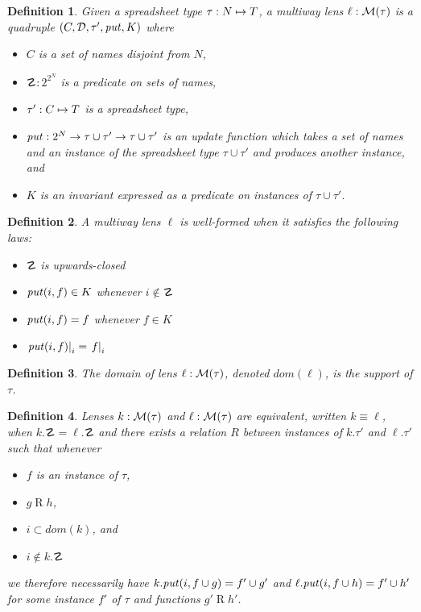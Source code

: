 \documentclass{article}
\newtheorem{definition}{Definition}
\begin{document}
\begin{definition}
    Given a spreadsheet type $\tau : N \mapsto T$,
    a \emph{multiway lens} $\ell : \mathcal M(\tau)$ is a quadruple
    $(C,\mathcal D,\tau',\mathit{put},K)$ where
    \begin{itemize}
        \item $C$ is a set of names disjoint from $N$,
        \item $\danger : 2^{2^N}$ is a predicate on sets of names,
        \item $\tau' : C \mapsto T$ is a spreadsheet type,
        \item $\mathit{put} : 2^N \to \tau \cup \tau' \to \tau \cup \tau'$
            is an update function which takes a set of names and an instance
            of the spreadsheet type $\tau \cup \tau'$ and produces another
            instance, and
        \item $K$ is an invariant expressed as a predicate on instances of
            $\tau \cup \tau'$.
    \end{itemize}
\end{definition}

\begin{definition}
    A multiway lens $\ell$ is \emph{well-formed} when it satisfies the
    following laws:
    \begin{itemize}
        \item $\danger$ is upwards-closed
        \item $\mathit{put}(i,f) \in K$ whenever $i \notin \danger$
        \item $\mathit{put}(i,f) = f$ whenever $f \in K$
        \item $\left.\mathit{put}(i,f)\right|_i = \left.f\right|_i$
    \end{itemize}
\end{definition}

\newcommand{\mdomain}[1]{\mathit{dom}(#1)}
\begin{definition}
    The \emph{domain} of lens $\ell : \mathcal M(\tau)$, denoted $\mdomain\ell$, is
    the support of $\tau$.
\end{definition}

\begin{definition}
    Lenses $k : \mathcal M(\tau)$ and $\ell : \mathcal M(\tau)$ are \emph{equivalent},
    written $k \equiv \ell$, when $k.\danger = \ell.\danger$ and there
    exists a relation $R$ between instances of $k.\tau'$ and $\ell.\tau'$
    such that whenever
    \begin{itemize}
        \item $f$ is an instance of $\tau$,
        \item $g\mathrel Rh$,
        \item $i \subset \mdomain k$, and
        \item $i \notin k.\danger$
    \end{itemize}
    we therefore necessarily have $k.\mathit{put}(i,f \cup g)=f' \cup g'$ and
    $\ell.\mathit{put}(i,f \cup h)=f' \cup h'$ for some instance $f'$ of $\tau$ and
    functions $g'\mathrel Rh'$.
\end{definition}
\end{document}
